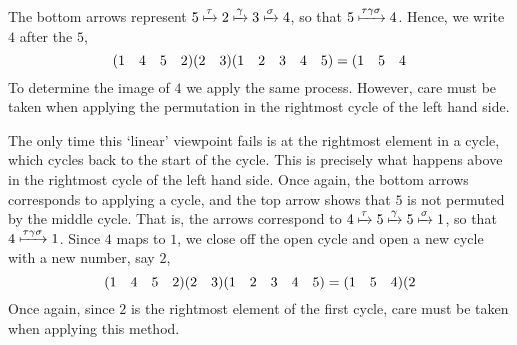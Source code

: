 \begin{example}
    \begin{figure}[h]
        \centering
    \end{figure}

    The bottom arrows represent $5 \xmapsto{\tau} 2 \xmapsto{\gamma} 3 \xmapsto{\sigma} 4$, so that $5 \xmapsto{\tau\gamma\sigma} 4$. Hence, we write $4$ after the $5$,
    \[
    (1 \quad 4 \quad 5 \quad 2)(2 \quad 3)(1 \quad 2 \quad 3 \quad 4 \quad 5) = (1 \quad 5 \quad 4
    \]
    To determine the image of $4$ we apply the same process. However, care must be taken when applying the permutation in the rightmost cycle of the left hand side.\newpage

    \begin{figure}[ht]
        \centering
    \end{figure}

    The only time this `linear' viewpoint fails is at the rightmost element in a cycle, which cycles back to the start of the cycle. This is precisely what happens above in the rightmost cycle of the left hand side. Once again, the bottom arrows corresponds to applying a cycle, and the top arrow shows that $5$ is not permuted by the middle cycle. That is, the arrows correspond to $4 \xmapsto{\tau} 5 \xmapsto{\gamma} 5 \xmapsto{\sigma} 1$, so that $4 \xmapsto{\tau\gamma\sigma} 1$. Since $4$ maps to $1$, we close off the open cycle and open a new cycle with a new number, say $2$,
    \[
    (1 \quad 4 \quad 5 \quad 2)(2 \quad 3)(1 \quad 2 \quad 3 \quad 4 \quad 5) = (1 \quad 5 \quad 4)(2
    \]
    Once again, since $2$ is the rightmost element of the first cycle, care must be taken when applying this method.


\end{example}
